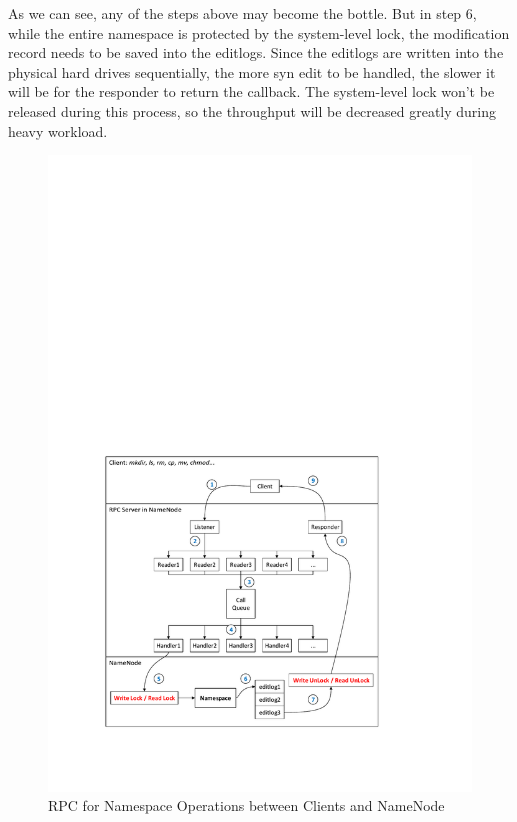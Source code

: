 \noindent As we can see, any of the steps above may become the bottle. But in step 6, while the entire namespace is protected by the system-level lock, the modification record needs to be saved into the editlogs. Since the editlogs are written into the physical hard drives sequentially, the more syn edit to be handled, the slower it will be for the responder to return the callback. The system-level lock won't be released during this process, so the throughput will be decreased greatly during heavy workload.

\begin{figure}[ht]
	\centering
	\includegraphics[scale=0.8]{figs/nnRPC.pdf}
	\caption{RPC for Namespace Operations between Clients and NameNode}
	\label{fig:nnRPC}
\end{figure}

